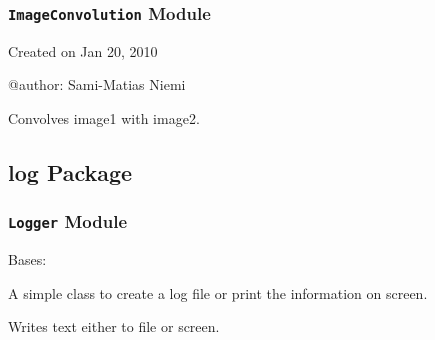 \documentclass[letterpaper,10pt,english]{sphinxmanual}
\begin{document}
\subsubsection{\texttt{ImageConvolution} Module}
\label{SamPy.image:module-SamPy.image.ImageConvolution}\label{SamPy.image:imageconvolution-module}
Created on Jan 20, 2010

@author: Sami-Matias Niemi


\begin{fulllineitems}
\label{SamPy.image:SamPy.image.ImageConvolution.Convolve}
Convolves image1 with image2.

\end{fulllineitems}



\subsection{log Package}
\label{SamPy.log:log-package}\label{SamPy.log::doc}

\subsubsection{\texttt{Logger} Module}
\label{SamPy.log:module-SamPy.log.Logger}\label{SamPy.log:logger-module}

\begin{fulllineitems}
\label{SamPy.log:SamPy.log.Logger.SimpleLogger}
Bases: 

A simple class to create a log file or print the information on screen.


\begin{fulllineitems}
\label{SamPy.log:SamPy.log.Logger.SimpleLogger.write}
Writes text either to file or screen.

\end{fulllineitems}


\end{fulllineitems}
\end{document}
